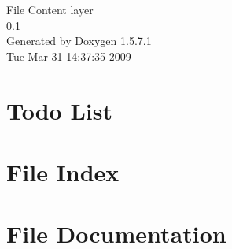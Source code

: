 \documentclass[a4paper]{book}
\begin{document}
\begin{titlepage}
\vspace*{7cm}
\begin{center}
{\Large File Content layer \\[1ex]\large 0.1 }\\
\vspace*{1cm}
{\large Generated by Doxygen 1.5.7.1}\\
\vspace*{0.5cm}
{\small Tue Mar 31 14:37:35 2009}\\
\end{center}
\end{titlepage}
\clearemptydoublepage
{}
\tableofcontents
\clearemptydoublepage
{}
\chapter{Todo List}
\label{todo}

\chapter{File Index}

\chapter{File Documentation}












\printindex
\end{document}
